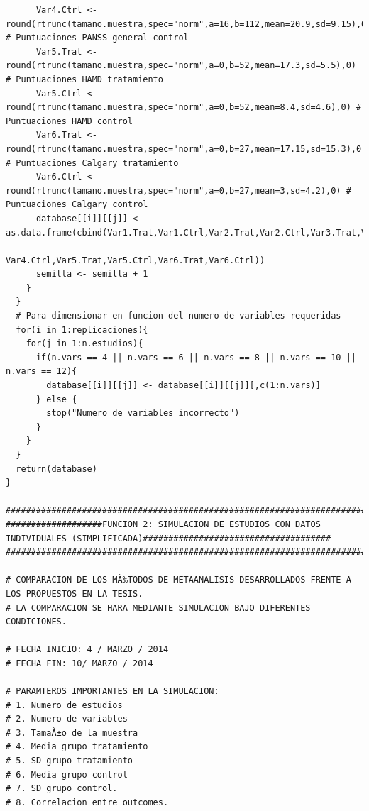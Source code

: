 \documentclass[a4paper,openright,12pt]{report}
\begin{document}
{\begin{verbatim}
      Var4.Ctrl <- round(rtrunc(tamano.muestra,spec="norm",a=16,b=112,mean=20.9,sd=9.15),0) # Puntuaciones PANSS general control
      Var5.Trat <- round(rtrunc(tamano.muestra,spec="norm",a=0,b=52,mean=17.3,sd=5.5),0) # Puntuaciones HAMD tratamiento
      Var5.Ctrl <- round(rtrunc(tamano.muestra,spec="norm",a=0,b=52,mean=8.4,sd=4.6),0) # Puntuaciones HAMD control
      Var6.Trat <- round(rtrunc(tamano.muestra,spec="norm",a=0,b=27,mean=17.15,sd=15.3),0) # Puntuaciones Calgary tratamiento
      Var6.Ctrl <- round(rtrunc(tamano.muestra,spec="norm",a=0,b=27,mean=3,sd=4.2),0) # Puntuaciones Calgary control
      database[[i]][[j]] <- as.data.frame(cbind(Var1.Trat,Var1.Ctrl,Var2.Trat,Var2.Ctrl,Var3.Trat,Var3.Ctrl,Var4.Trat,
                                                Var4.Ctrl,Var5.Trat,Var5.Ctrl,Var6.Trat,Var6.Ctrl))
      semilla <- semilla + 1
    }
  }
  # Para dimensionar en funcion del numero de variables requeridas
  for(i in 1:replicaciones){
    for(j in 1:n.estudios){
      if(n.vars == 4 || n.vars == 6 || n.vars == 8 || n.vars == 10 || n.vars == 12){
        database[[i]][[j]] <- database[[i]][[j]][,c(1:n.vars)]
      } else {
        stop("Numero de variables incorrecto")
      }
    }
  }
  return(database)
}

###############################################################################################################################
###################FUNCION 2: SIMULACION DE ESTUDIOS CON DATOS INDIVIDUALES (SIMPLIFICADA)#####################################
###############################################################################################################################

# COMPARACION DE LOS MÃ‰TODOS DE METAANALISIS DESARROLLADOS FRENTE A LOS PROPUESTOS EN LA TESIS.
# LA COMPARACION SE HARA MEDIANTE SIMULACION BAJO DIFERENTES CONDICIONES.

# FECHA INICIO: 4 / MARZO / 2014
# FECHA FIN: 10/ MARZO / 2014

# PARAMTEROS IMPORTANTES EN LA SIMULACION:
# 1. Numero de estudios
# 2. Numero de variables
# 3. TamaÃ±o de la muestra
# 4. Media grupo tratamiento
# 5. SD grupo tratamiento
# 6. Media grupo control
# 7. SD grupo control.
# 8. Correlacion entre outcomes.


\end{verbatim}}
\end{document}
